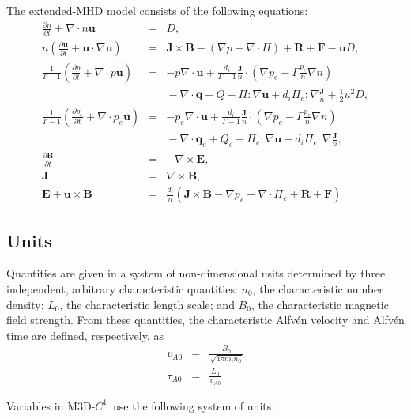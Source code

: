 \documentclass[letterpaper]{book}
\newcommand{\ddt}[1]{\frac{\partial #1}{\partial t}}
\renewcommand{\vec}[1]{\ensuremath{\mathbf{#1}}}
\newcommand{\tensor}[1]{\mathsf{#1}}
\newcommand{\B}{\vec{B}}
\newcommand{\E}{\vec{E}}
\newcommand{\R}{\vec{R}}
\renewcommand{\u}{\vec{u}}
\newcommand{\F}{\vec{F}}
\renewcommand{\j}{\vec{J}}
\newcommand{\q}{\vec{q}}
\newcommand{\jn}{\frac{\j}{n}}
\renewcommand{\P}{\tensor{\Pi}}
\newcommand{\codename}{\textsc{M3D-$C^1$}}
\renewcommand{\div}[1]{\nabla \cdot #1}
\newcommand{\curl}[1]{\nabla \times #1}
\newcommand{\dotdot}{:}
\begin{document}
The extended-MHD model consists of the following equations:
\begin{subequations} \label{eq:xmhd}
\begin{eqnarray}
  \label{eq:continuity}
  \ddt{n} + \div n \u & = & D,
  \\
  \label{eq:momentum}
  n \left( \ddt{\u} + \u \cdot \nabla \u \right) 
  & = & \j \times \B - (\nabla p + \div \P) + \R + \F - \u D,
  \\
  \frac{1}{\Gamma-1} \left( \ddt{p} + \div{p\u} \right)
  & = & -p \div\u +
  \frac{d_i}{\Gamma-1}\jn\cdot\left(\nabla p_e -
  \Gamma \frac{p_e}{n}\nabla n \right)
  \\ & & \mbox{}
  - \div{\q} + Q - \P\dotdot\nabla \u + d_i \P_e\dotdot\nabla \jn + \frac{1}{2} u^2 D,
  \nonumber \\
  \frac{1}{\Gamma-1} \left( \ddt{p_e} + \div{p_e\u} \right)
  & = & -p_e \div\u +
  \frac{d_i}{\Gamma-1}\jn\cdot\left(\nabla p_e -
  \Gamma \frac{p_e}{n}\nabla n \right)
  \\ & & \mbox{} 
  - \div{\q_e} + Q_e - \P_e\dotdot\nabla \u + d_i \P_e\dotdot\nabla \jn,
  \nonumber 
  \\
  \label{eq:Faraday}
  \ddt{\B} & = & -\curl \E,
  \\
  \j & = &\curl \B,
  \\
  \label{eq:ohm}
  \E + \u \times \B & = &  
  \frac{d_i}{n} \left(\j\times\B - \nabla p_e 
  - \div{\P_e} + \R + \F \right)
\end{eqnarray}
\end{subequations}

\subsection{Units}

Quantities are given in a system of non-dimensional usits determined
by three independent, arbitrary characteristic quantities: $n_0$, the
characteristic number density; $L_0$, the characteristic length scale;
and $B_0$, the characteristic magnetic field strength.  From these
quantities, the characteristic Alfv\'en velocity and Alfv\'en time are
defined, respectively, as
\begin{eqnarray}
  v_{A 0} & = & \frac{B_0}{\sqrt{4\pi m_i n_0}}\\
  \tau_{A 0} & = & \frac{L_0}{v_{A 0}}
\end{eqnarray}

Variables in \codename\ use the following system of units:
\end{document}
